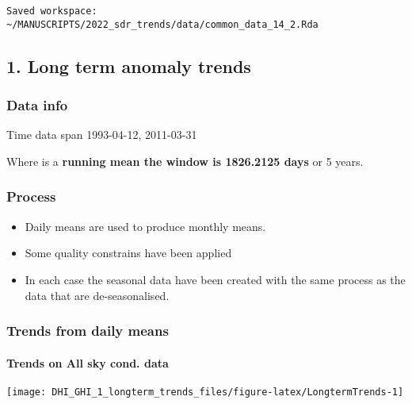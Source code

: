\documentclass[
  10pt,
  a4paper,oneside]{article}
\providecommand{\tightlist}{%
  \setlength{\itemsep}{0pt}\setlength{\parskip}{0pt}}
\begin{document}
\begin{verbatim}
Saved workspace: ~/MANUSCRIPTS/2022_sdr_trends/data/common_data_14_2.Rda 
\end{verbatim}

\hypertarget{long-term-anomaly-trends}{%
\subsection{1. Long term anomaly trends}\label{long-term-anomaly-trends}}

\hypertarget{data-info}{%
\subsubsection{Data info}\label{data-info}}

Time data span 1993-04-12, 2011-03-31

Where is a \textbf{running mean the window is 1826.2125 days} or
5 years.

\hypertarget{process}{%
\subsubsection{Process}\label{process}}

\begin{itemize}
\tightlist
\item
  Daily means are used to produce monthly means.
\item
  Some quality constrains have been applied
\item
  In each case the seasonal data have been created with the same process as
  the data that are de-seasonalised.
\end{itemize}

\newpage
\FloatBarrier

\hypertarget{trends-from-daily-means}{%
\subsubsection{Trends from daily means}\label{trends-from-daily-means}}

\newpage

\hypertarget{trends-on-all-sky-cond.-data}{%
\paragraph{Trends on All sky cond. data}\label{trends-on-all-sky-cond.-data}}

\begin{center}\texttt{[image: DHI\_GHI\_1\_longterm\_trends\_files/figure-latex/LongtermTrends-1]} \end{center}
\end{document}
